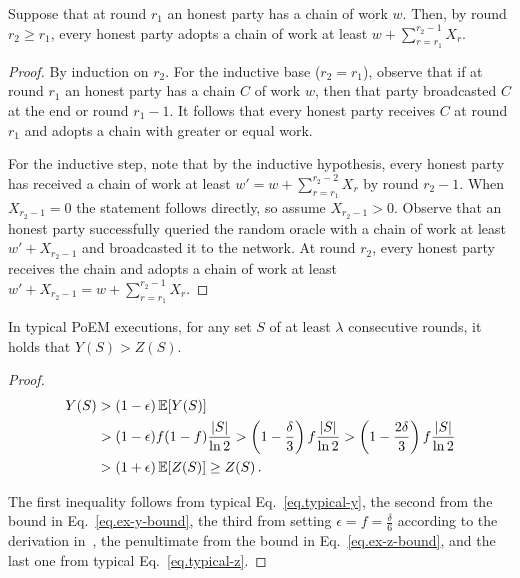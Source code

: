 \begin{lemma}\label{lem:chain-growth}
  Suppose that at round $r_1$ an honest party has a chain of work $w$.
  Then, by round $r_2 \geq r_1$, every honest party adopts a chain of work at least
  $w + \sum_{r = r_1}^{r_2 - 1}{X_r}$.
\end{lemma}
\begin{proof}
  By induction on $r_2$. For the inductive base ($r_2 = r_1$), observe that
  if at round $r_1$ an honest party has a chain $C$ of work $w$, then
  that party broadcasted $C$ at the end or round $r_1 - 1$. It follows that
  every honest party receives $C$ at round $r_1$ and adopts a chain with
  greater or equal work.

  For the inductive step, note that by the inductive hypothesis,
  every honest party has received a chain of work at least $w' = w + \sum_{r = r_1}^{r_2 - 2}{X_r}$
  by round $r_2 - 1$. When $X_{r_2 - 1} = 0$ the statement follows directly, so assume
  $X_{r_2 - 1} > 0$. Observe that an honest party successfully queried the random oracle
  with a chain of work at least $w' + X_{r_2 - 1}$ and broadcasted it to the network.
  At round $r_2$, every honest party receives the chain and adopts a chain
  of work at least $w' + X_{r_2 - 1} = w + \sum_{r = r_1}^{r_2 - 1}{X_r}$. \Qed
\end{proof}

\begin{lemma} \label{lem:typical-bounds}
  In typical PoEM executions, for any set $S$ of at least $\lambda$ consecutive rounds,
  it holds that $Y(S) > Z(S)$.
\end{lemma}
\begin{proof}
  \begin{align*}
    Y(S) &> (1 - \epsilon)\mathop{{}\mathbb{E}}[Y(S)]\\
         &> (1 - \epsilon) f (1 - f) \frac{|S|}{\ln2}
          > \left(1 - \frac{\delta}{3}\right) f \frac{|S|}{\ln2}
          > \left(1 - \frac{2\delta}{3}\right) f \frac{|S|}{\ln2}\\
         &> (1 + \epsilon)\mathop{{}\mathbb{E}}[Z(S)] \geq Z(S)\,.
  \end{align*}

  The first inequality follows from typical Eq.~\ref{eq.typical-y},
  the second from the bound in Eq.~\ref{eq.ex-y-bound},
  the third from setting $\epsilon = f = \frac{\delta}{6}$
  according to the derivation in~\cite[Chapter 13]{blockchain-foundations},
  the penultimate from the bound in Eq.~\ref{eq.ex-z-bound},
  and the last one from typical Eq.~\ref{eq.typical-z}.
  \Qed
\end{proof}

